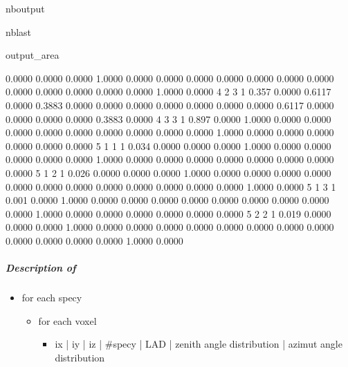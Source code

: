 \documentclass[letterpaper,10pt,english]{sphinxmanual}
\begin{document}
\begin{sphinxuseclass}{nboutput}
\begin{sphinxuseclass}{nblast}
{\begin{sphinxuseclass}{output_area}
\begin{sphinxuseclass}{}
\begin{sphinxVerbatim}[commandchars=\\\{\}]
 0.0000 0.0000 0.0000 1.0000 0.0000 0.0000 0.0000 0.0000 0.0000
 0.0000 0.0000 0.0000 0.0000 0.0000 0.0000 0.0000 1.0000 0.0000
  4  2  3  1      0.357
 0.0000 0.6117 0.0000 0.3883 0.0000 0.0000 0.0000 0.0000 0.0000
 0.0000 0.0000 0.6117 0.0000 0.0000 0.0000 0.0000 0.3883 0.0000
  4  3  3  1      0.897
 0.0000 1.0000 0.0000 0.0000 0.0000 0.0000 0.0000 0.0000 0.0000
 0.0000 0.0000 1.0000 0.0000 0.0000 0.0000 0.0000 0.0000 0.0000
  5  1  1  1      0.034
 0.0000 0.0000 0.0000 1.0000 0.0000 0.0000 0.0000 0.0000 0.0000
 1.0000 0.0000 0.0000 0.0000 0.0000 0.0000 0.0000 0.0000 0.0000
  5  1  2  1      0.026
 0.0000 0.0000 0.0000 1.0000 0.0000 0.0000 0.0000 0.0000 0.0000
 0.0000 0.0000 0.0000 0.0000 0.0000 0.0000 0.0000 1.0000 0.0000
  5  1  3  1      0.001
 0.0000 1.0000 0.0000 0.0000 0.0000 0.0000 0.0000 0.0000 0.0000
 0.0000 0.0000 1.0000 0.0000 0.0000 0.0000 0.0000 0.0000 0.0000
  5  2  2  1      0.019
 0.0000 0.0000 0.0000 1.0000 0.0000 0.0000 0.0000 0.0000 0.0000
 0.0000 0.0000 0.0000 0.0000 0.0000 0.0000 0.0000 1.0000 0.0000
\end{sphinxVerbatim}



\end{sphinxuseclass}
\end{sphinxuseclass}
}

\end{sphinxuseclass}
\end{sphinxuseclass}

\subparagraph{Description of }
\label{\detokenize{misc_functionnalities:Description-of-leafarea}}\begin{itemize}
\item {} 
\sphinxAtStartPar
for each specy
\begin{itemize}
\item {} 
\sphinxAtStartPar
for each voxel
\begin{itemize}
\item {} 
\sphinxAtStartPar
ix | iy | iz | \#specy | LAD | zenith angle distribution | azimut angle distribution

\end{itemize}

\end{itemize}

\end{itemize}
\end{document}
